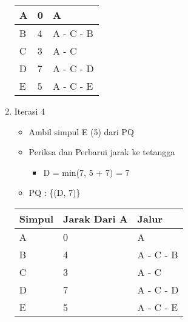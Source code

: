 \begin{enumerate}
\begin{table}[h]
\begin{tabular}{|l|l|l|}
            A               & 0                     & A     \\ \hline
            B               & 4                     & A - C - B     \\ \hline
            C               & 3                     & A - C     \\ \hline
            D               & 7                     & A - C - D     \\ \hline
            E               & 5                     & A - C - E     \\ \hline
        \end{tabular}
    \end{table}

    \item Iterasi 4
    \begin{itemize}
        \item Ambil simpul E (5) dari PQ
        \item Periksa dan Perbarui jarak ke tetangga
        \begin{itemize}
            \item D = min(7, 5 + 7) = 7
        \end{itemize}
        \item PQ : \{(D, 7)\}
    \end{itemize}
    \begin{table}[H]
        \begin{tabular}{|l|l|l|}
        \hline
            \textbf{Simpul} & \textbf{Jarak Dari A} & \textbf{Jalur} \\ \hline
            A               & 0                     & A     \\ \hline
            B               & 4                     & A - C - B     \\ \hline
            C               & 3                     & A - C     \\ \hline
            D               & 7                     & A - C - D     \\ \hline
            E               & 5                     & A - C - E     \\ \hline
        \end{tabular}
    \end{table}


\end{enumerate}
